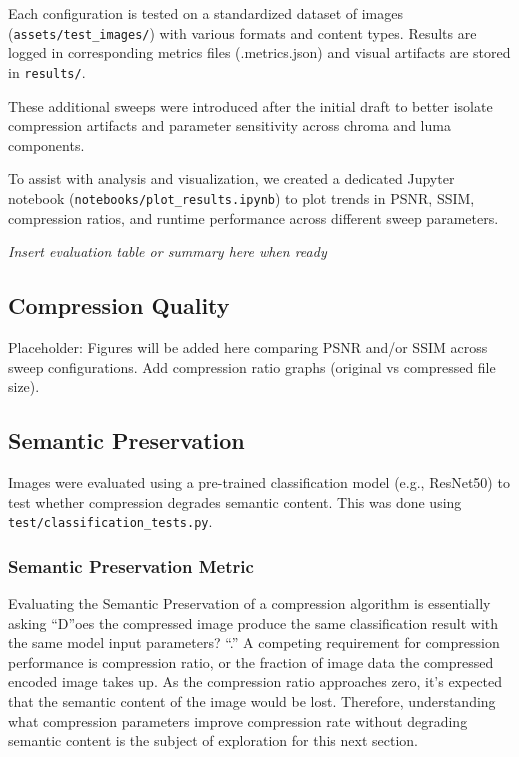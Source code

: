 Each configuration is tested on a standardized dataset of images (\texttt{assets/test\_images/}) with various formats and content types. Results are logged in corresponding metrics files (.metrics.json) and visual artifacts are stored in \texttt{results/}.

These additional sweeps were introduced after the initial draft to better isolate compression artifacts and parameter sensitivity across chroma and luma components.

To assist with analysis and visualization, we created a dedicated Jupyter notebook (\texttt{notebooks/plot\_results.ipynb}) to plot trends in PSNR, SSIM, compression ratios, and runtime performance across different sweep parameters.

\textit{Insert evaluation table or summary here when ready}

\subsection{Compression Quality}
Placeholder: Figures will be added here comparing PSNR and/or SSIM across sweep configurations. Add compression ratio graphs (original vs compressed file size).

\subsection{Semantic Preservation}
Images were evaluated using a pre-trained classification model (e.g., ResNet50) to test whether compression degrades semantic content. This was done using \texttt{test/classification\_tests.py}.

\subsubsection{Semantic Preservation Metric}

Evaluating the Semantic Preservation of a compression algorithm is essentially asking \enquote Does the compressed image produce the same classification result with the same model input parameters? \enquote. A competing requirement for compression performance is compression ratio, or the fraction of image data the compressed encoded image takes up. As the compression ratio approaches zero, it's expected that the semantic content of the image would be lost. Therefore, understanding what compression parameters improve compression rate without degrading semantic content is the subject of exploration for this next section.

